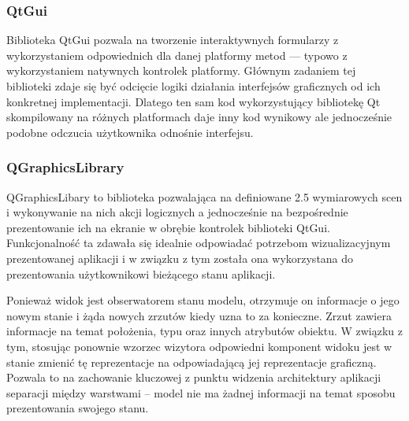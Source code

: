 {{{\subsubsection{QtGui}
\par{
Biblioteka QtGui pozwala na tworzenie interaktywnych formularzy z wykorzystaniem odpowiednich dla danej platformy metod --- typowo z wykorzystaniem natywnych kontrolek platformy. Głównym zadaniem tej biblioteki zdaje się być odcięcie logiki działania interfejsów graficznych od ich konkretnej implementacji. Dlatego ten sam kod wykorzystujący bibliotekę Qt skompilowany na różnych platformach daje inny kod wynikowy ale jednocześnie podobne odczucia użytkownika odnośnie interfejsu.
}
\subsubsection{QGraphicsLibrary}
\par{
QGraphicsLibary to biblioteka pozwalająca na definiowane 2.5 wymiarowych scen i wykonywanie na nich akcji logicznych a jednocześnie na bezpośrednie prezentowanie ich na ekranie w obrębie kontrolek biblioteki QtGui. Funkcjonalność ta zdawała się idealnie odpowiadać potrzebom wizualizacyjnym prezentowanej aplikacji i w związku z tym została ona wykorzystana do prezentowania użytkownikowi bieżącego stanu aplikacji.
}
\par{
Ponieważ widok jest obserwatorem stanu modelu, otrzymuje on informacje o jego nowym stanie i żąda nowych zrzutów kiedy uzna to za konieczne. Zrzut zawiera informacje na temat położenia, typu oraz innych atrybutów obiektu. W związku z tym, stosując ponownie wzorzec wizytora odpowiedni komponent widoku jest w stanie zmienić tę reprezentacje na odpowiadającą jej reprezentacje graficzną. Pozwala to na zachowanie kluczowej z punktu widzenia architektury aplikacji separacji między warstwami -- model nie ma żadnej informacji na temat sposobu prezentowania swojego stanu.
}

}}}
